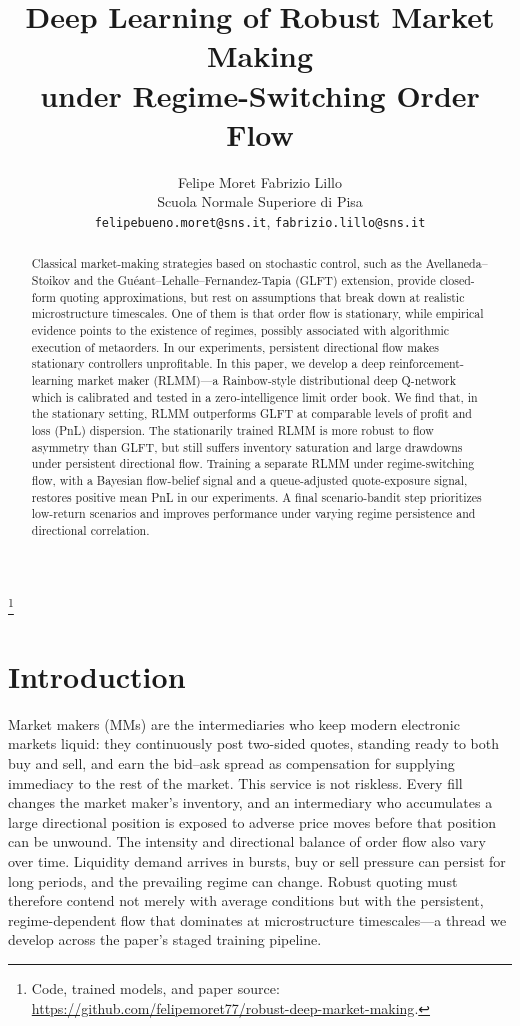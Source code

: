 \documentclass[11pt,a4paper]{article}
\title{Deep Learning of Robust Market Making \\ under Regime-Switching Order Flow}
\author{%
  Felipe Moret \quad Fabrizio Lillo \\[2pt]
  \small Scuola Normale Superiore di Pisa \\
  \small \texttt{felipebueno.moret@sns.it}, \;
  \texttt{fabrizio.lillo@sns.it}%
}
\date{}
\newcommand\blfootnote[1]{%
  \begingroup
  \renewcommand\thefootnote{}\footnote{#1}%
  \addtocounter{footnote}{-1}%
  \endgroup
}
\begin{document}
\maketitle
\blfootnote{\raggedright{} Code, trained models, and paper source:
\url{https://github.com/felipemoret77/robust-deep-market-making}.}

\begin{abstract}
Classical market-making strategies based on stochastic control, such as
the Avellaneda--Stoikov and the Gu\'{e}ant--Lehalle--Fernandez-Tapia (GLFT)
extension, provide closed-form quoting approximations, but rest on assumptions that
break down at realistic microstructure timescales.  One of them is that
order flow is stationary, while empirical evidence points to the existence
of regimes, possibly associated with algorithmic execution of metaorders.
In our experiments, persistent directional flow makes stationary
controllers unprofitable.  In this paper, we
develop a deep reinforcement-learning market maker (RLMM)---a Rainbow-style
distributional deep Q-network which is calibrated and tested in a
zero-intelligence limit order book.  We find that, in the stationary
setting, RLMM outperforms GLFT at comparable levels of profit and loss
(PnL) dispersion.
The stationarily trained RLMM is more robust to flow asymmetry
than GLFT, but still suffers inventory saturation and large drawdowns
under persistent directional flow.  Training a separate RLMM under
regime-switching flow, with a Bayesian flow-belief signal and a
queue-adjusted quote-exposure signal, restores positive mean PnL in our
experiments.  A final scenario-bandit step prioritizes low-return
scenarios and improves performance under varying
regime persistence and directional correlation.
\end{abstract}

\section{Introduction}

Market makers (MMs) are the intermediaries who keep modern electronic
markets liquid: they continuously post two-sided quotes, standing
ready to both buy and sell, and earn the bid--ask spread as
compensation for supplying immediacy to the rest of the market.  This
service is not riskless.  Every fill changes the market maker's
inventory, and an intermediary who accumulates a large directional
position is exposed to adverse price moves before that position can
be unwound.  The intensity and directional balance of order flow also vary over
time. Liquidity demand arrives in bursts, buy or sell pressure can
persist for long periods, and the prevailing regime can change.
Robust quoting must therefore contend not merely with average
conditions but with the persistent, regime-dependent flow that
dominates at microstructure timescales---a thread we develop across
the paper's staged training pipeline.
\end{document}

